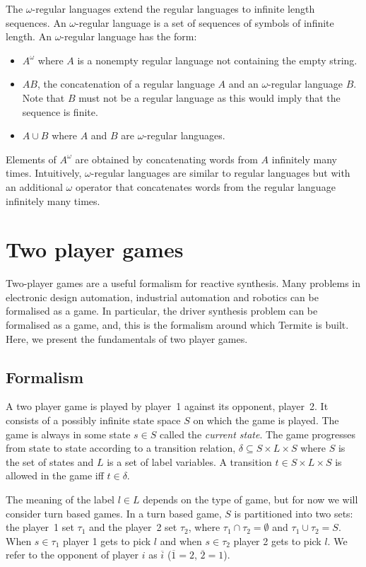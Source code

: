The $\omega$-regular languages extend the regular languages to infinite length sequences. An $\omega$-regular language is a set of sequences of symbols of infinite length. An $\omega$-regular language has the form:
\begin{itemize}
    \item $A^\omega$ where $A$ is a nonempty regular language not containing the empty string.
    \item $AB$, the concatenation of a regular language $A$ and an $\omega$-regular language $B$. Note that $B$ must not be a regular language as this would imply that the sequence is finite.
    \item $A \cup B$ where $A$ and $B$ are $\omega$-regular languages.
\end{itemize}

Elements of $A^\omega$ are obtained by concatenating words from $A$ infinitely many times. Intuitively, $\omega$-regular languages are similar to regular languages but with an additional $\omega$ operator that concatenates words from the regular language infinitely many times.

\section{Two player games}

Two-player games are a useful formalism for reactive synthesis. Many problems in electronic design automation, industrial automation and robotics can be formalised as a game. In particular, the driver synthesis problem can be formalised as a game, and, this is the formalism around which Termite is built. Here, we present the fundamentals of two player games. 

\subsection{Formalism}

A two player game is played by player~1 against its opponent, player~2. It consists of a possibly infinite state space $S$ on which the game is played. The game is always in some state $s \in S$ called the \emph{current state}. The game progresses from state to state according to a transition relation, $\delta \subseteq S \times L \times S$ where $S$ is the set of states and $L$ is a set of label variables. A transition $t \in S \times L \times S$ is allowed in the game iff $t \in \delta$. 

The meaning of the label $l \in L$ depends on the type of game, but for now we will consider turn based games. In a turn based game, $S$ is partitioned into two sets: the player~1 set $\tau_1$ and the player~2 set $\tau_2$, where $\tau_1 \cap \tau_2 = \emptyset$ and $ \tau_1 \cup \tau_2 = S$. When $s \in \tau_1$ player 1 gets to pick $l$ and when $s \in \tau_2$ player 2 gets to pick $l$. We refer to the opponent of player $i$ as $\overline{i}$ ($\overline{1} = 2$, $\overline{2} = 1$).

